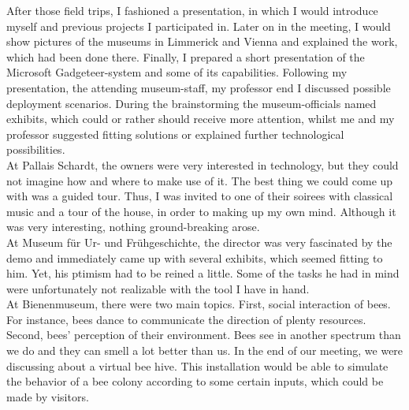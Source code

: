 After those field trips, I fashioned a presentation, in which I would introduce myself and previous projects I participated in. Later on in the meeting, I would show pictures of the museums in Limmerick and Vienna and explained the work, which had been done there. Finally, I prepared a short presentation of the Microsoft Gadgeteer-system and some of its capabilities. Following my presentation, the attending museum-staff, my professor end I discussed possible deployment scenarios. During the brainstorming the museum-officials named exhibits, which could or rather should receive more attention, whilst me and my professor suggested fitting solutions or explained further technological possibilities.
\\
At Pallais Schardt, the owners were very interested in technology, but they could not imagine how and where to make use of it. The best thing we could come up with was a guided tour. Thus, I was invited to one of their soirees with classical music and a tour of the house, in order to making up my own mind. Although it was very interesting, nothing ground-breaking arose.
\\
At Museum für Ur- und Frühgeschichte, the director was very fascinated by the demo and immediately came up with several exhibits, which seemed fitting to him. Yet, his  ptimism had to be reined a little. Some of the tasks he had in mind were unfortunately not realizable with the tool I have in hand.
\\
At Bienenmuseum, there were two main topics. First, social interaction of bees. For instance, bees dance to communicate the direction of plenty resources. Second, bees' perception of their environment. Bees see in another spectrum than we do and they can smell a lot better than us. In the end of our meeting, we were discussing about a virtual bee hive. This installation would be able
to simulate the behavior of a bee colony according to some certain inputs, which could be made by visitors.
\\
